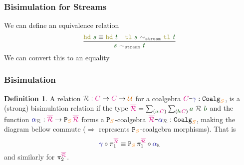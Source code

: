 \documentclass[xelatex,mathserif,serif,notheorems]{beamer} %
\theoremstyle{plain} %
\theoremstyle{definition}
\newtheorem{defn}[thm]{Definition}%
\theoremstyle{remark}
\newcommand*{\term}[1]{\textcolor{green!30!black}{#1}} %
\newcommand*{\type}[1]{\textcolor{magenta!90!black}{#1}}
\newcommand*{\container}[1]{\textcolor{orange}{#1}}
\newcommand*{\universe}[1]{\textcolor{orange!80!black}{#1}}
\newcommand*{\coalg}[2]{#1\texttt{-}#2}
\newcommand*{\relation}[1]{\textcolor{gray!75!black}{\ensuremath{\mathtt{#1}}}}
\newcommand*{\function}[1]{\textcolor{blue!60!black}{\ensuremath{\mathtt{#1}}}}
\newcommand*{\destructor}[1]{\textcolor{yellow!60!black}{\ensuremath{\mathtt{#1}}}}
\newcommand*{\typeformer}[1]{\ensuremath{\mathtt{#1}}}
\newcommand*{\functor}[1]{\ensuremath{\mathbf{\mathtt{#1}}}}
\newcommand{\setlengths}{
  \setlength{\abovedisplayskip}{4pt}
  \setlength{\belowdisplayskip}{4pt}
  \setlength{\abovedisplayshortskip}{2pt}
  \setlength{\belowdisplayshortskip}{2pt}
}
\begin{document}
\begin{frame}
  \frametitle{Bisimulation for Streams}
  We can define an equivalence relation
  \begin{equation}
    \vcenter{\infer{\term{s}~\relation{\sim_{stream}}~\term{t}}{\destructor{hd}~\term{s} \equiv \destructor{hd}~\term{t} & \destructor{tl}~\term{s}~\relation{\sim_{stream}}~\destructor{tl}~\term{t}}}
  \end{equation}
  We can convert this to an equality 
\end{frame}

\begin{frame}[fragile]
  \frametitle{Bisimulation}
  \begin{defn}\setlengths
    A relation \(\relation{\mathcal{R}} : \type{C} \rightarrow \type{C} \rightarrow \universe{\mathcal{U}}\) for a coalgebra \(\coalg{\type{C}}{\function{\gamma}} : \typeformer{Coalg}_{\container{S}}\), is a (strong) bisimulation relation if the type \(\type{\overline{\mathcal{R}}} = \sum_{(\term{a} : \type{C})} \sum_{(\term{b} : \type{C})} \term{a}~\relation{\mathcal{R}}~\term{b}\) and the function \(\function{\alpha}_{\relation{\mathcal{R}}} : \type{\overline{\mathcal{R}}} \rightarrow \functor{P}_{\container{S}}\,\type{\overline{\mathcal{R}}}\) forms a \(\functor{P}_{\container{S}}\)-coalgebra \(\coalg{\type{\overline{\mathcal{R}}}}{\function{\alpha}_{\relation{\mathcal{R}}}} : \mathtt{Coalg}_{\container{S}}\), making the diagram bellow commute (\(\Longrightarrow\) represents \(\functor{P}_{\container{S}}\)-coalgebra morphisms). That is
    \begin{equation}
      \function{\gamma} \circ \pi_1^{\type{\overline{\mathcal{R}}}} \equiv \functor{P}_{\container{S}}\,\pi_1^{\type{\overline{\mathcal{R}}}} \circ \function{\alpha}_{\relation{R}}
    \end{equation}
    and similarly for \(\pi_2^{\type{\overline{\mathcal{R}}}}\).
  \end{defn}
  \begin{figure}[h]
    \centering
  \end{figure}
\end{frame}
\end{document}
